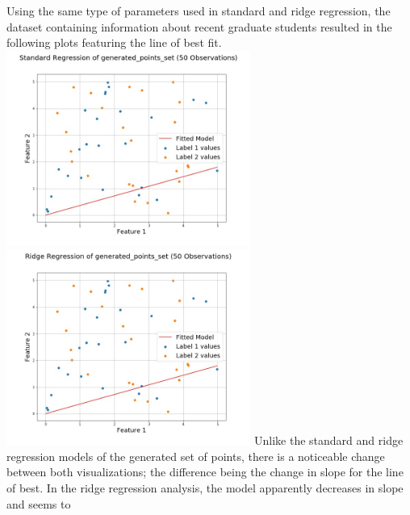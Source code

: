 \documentclass[a4paper,12pt]{IEEEtran}
\begin{document}
Using the same type of parameters used in standard and ridge regression, the dataset containing information about recent graduate students resulted in the following plots featuring the line of best fit. \includegraphics[width=8cm]{std_reg_1d_generated_points_set} \includegraphics[width=8cm]{ridge_reg_1d_generated_points_set} Unlike the standard and ridge regression models of the generated set of points, there is a noticeable change between both visualizations; the difference being the change in slope for the line of best. In the ridge regression analysis, the model apparently decreases in slope and seems to 
\end{document}
